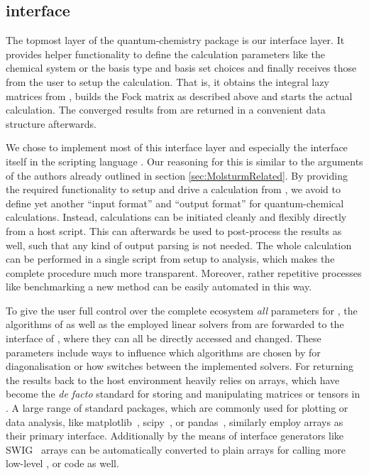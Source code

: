 \subsection{\python interface}
\label{sec:MolsturmPython}

The topmost layer of the \molsturm quantum-chemistry
package is our interface layer.
It provides helper functionality to
define the calculation parameters like the chemical system
or the basis type and basis set choices
and finally receives those from the user
to setup the calculation.
That is, it obtains the integral lazy matrices
from \gint, builds the Fock matrix
as described above and starts the actual \SCF calculation.
The converged results from \gscf are
returned in a convenient data structure afterwards.

We chose to implement most of this interface layer
and especially the interface itself
in the scripting language \python.
Our reasoning for this is similar to the arguments
of the \pyscf authors already outlined in section \ref{sec:MolsturmRelated}.
By providing the required functionality to setup and drive
a \molsturm calculation from \python,
we avoid to define yet another ``input format'' and ``output format''
for quantum-chemical calculations.
Instead, calculations can be initiated cleanly and flexibly
directly from a host script.
This can afterwards be used to post-process the results as well,
such that any kind of output parsing is not needed.
The whole calculation can be performed in a single script
from setup to analysis,
which makes the complete procedure much more transparent.
Moreover, rather repetitive processes like
benchmarking a new method
can be easily automated in this way.

To give the user full control over the complete \molsturm ecosystem
\emph{all} parameters for \gint, the \SCF algorithms of \gscf
as well as the employed linear solvers from \lazyten are forwarded
to the \python interface of \molsturm,
where they can all be directly accessed and changed.
These parameters include ways to influence which algorithms are
chosen by \lazyten for diagonalisation
or how \gscf switches between the implemented \SCF solvers.
For returning the \SCF results back to the host environment \molsturm
heavily relies on \numpy arrays,
which have become the \textit{de facto} standard
for storing and manipulating matrices or tensors in \python.
A large range of standard \python packages,
which are commonly used for plotting or data analysis,
like matplotlib~\cite{Matplotlib}, scipy~\cite{Walt2011,scipyWeb},
or pandas~\cite{pandasWeb},
similarly employ \numpy arrays as their primary interface.
Additionally by the means of interface generators like SWIG~\cite{swigWeb}
\numpy arrays can be automatically converted to plain
\ccc arrays for calling more low-level \cpp, \ccc or \fortran code as well.

